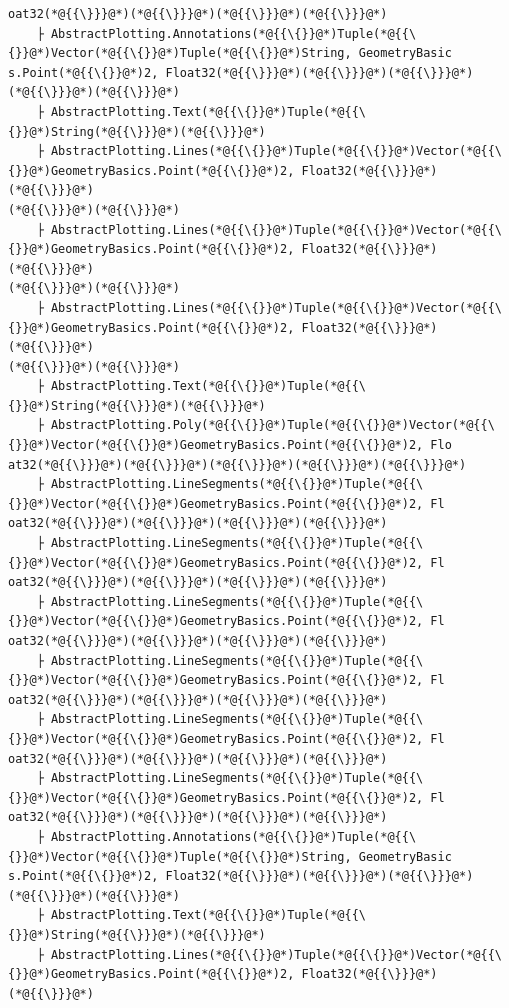 \documentclass[12pt,a4paper]{article}
\begin{document}
\begin{lstlisting}
oat32(*@{{\}}}@*)(*@{{\}}}@*)(*@{{\}}}@*)(*@{{\}}}@*)
    ├ AbstractPlotting.Annotations(*@{{\{}}@*)Tuple(*@{{\{}}@*)Vector(*@{{\{}}@*)Tuple(*@{{\{}}@*)String, GeometryBasic
s.Point(*@{{\{}}@*)2, Float32(*@{{\}}}@*)(*@{{\}}}@*)(*@{{\}}}@*)(*@{{\}}}@*)(*@{{\}}}@*)
    ├ AbstractPlotting.Text(*@{{\{}}@*)Tuple(*@{{\{}}@*)String(*@{{\}}}@*)(*@{{\}}}@*)
    ├ AbstractPlotting.Lines(*@{{\{}}@*)Tuple(*@{{\{}}@*)Vector(*@{{\{}}@*)GeometryBasics.Point(*@{{\{}}@*)2, Float32(*@{{\}}}@*)(*@{{\}}}@*)
(*@{{\}}}@*)(*@{{\}}}@*)
    ├ AbstractPlotting.Lines(*@{{\{}}@*)Tuple(*@{{\{}}@*)Vector(*@{{\{}}@*)GeometryBasics.Point(*@{{\{}}@*)2, Float32(*@{{\}}}@*)(*@{{\}}}@*)
(*@{{\}}}@*)(*@{{\}}}@*)
    ├ AbstractPlotting.Lines(*@{{\{}}@*)Tuple(*@{{\{}}@*)Vector(*@{{\{}}@*)GeometryBasics.Point(*@{{\{}}@*)2, Float32(*@{{\}}}@*)(*@{{\}}}@*)
(*@{{\}}}@*)(*@{{\}}}@*)
    ├ AbstractPlotting.Text(*@{{\{}}@*)Tuple(*@{{\{}}@*)String(*@{{\}}}@*)(*@{{\}}}@*)
    ├ AbstractPlotting.Poly(*@{{\{}}@*)Tuple(*@{{\{}}@*)Vector(*@{{\{}}@*)Vector(*@{{\{}}@*)GeometryBasics.Point(*@{{\{}}@*)2, Flo
at32(*@{{\}}}@*)(*@{{\}}}@*)(*@{{\}}}@*)(*@{{\}}}@*)(*@{{\}}}@*)
    ├ AbstractPlotting.LineSegments(*@{{\{}}@*)Tuple(*@{{\{}}@*)Vector(*@{{\{}}@*)GeometryBasics.Point(*@{{\{}}@*)2, Fl
oat32(*@{{\}}}@*)(*@{{\}}}@*)(*@{{\}}}@*)(*@{{\}}}@*)
    ├ AbstractPlotting.LineSegments(*@{{\{}}@*)Tuple(*@{{\{}}@*)Vector(*@{{\{}}@*)GeometryBasics.Point(*@{{\{}}@*)2, Fl
oat32(*@{{\}}}@*)(*@{{\}}}@*)(*@{{\}}}@*)(*@{{\}}}@*)
    ├ AbstractPlotting.LineSegments(*@{{\{}}@*)Tuple(*@{{\{}}@*)Vector(*@{{\{}}@*)GeometryBasics.Point(*@{{\{}}@*)2, Fl
oat32(*@{{\}}}@*)(*@{{\}}}@*)(*@{{\}}}@*)(*@{{\}}}@*)
    ├ AbstractPlotting.LineSegments(*@{{\{}}@*)Tuple(*@{{\{}}@*)Vector(*@{{\{}}@*)GeometryBasics.Point(*@{{\{}}@*)2, Fl
oat32(*@{{\}}}@*)(*@{{\}}}@*)(*@{{\}}}@*)(*@{{\}}}@*)
    ├ AbstractPlotting.LineSegments(*@{{\{}}@*)Tuple(*@{{\{}}@*)Vector(*@{{\{}}@*)GeometryBasics.Point(*@{{\{}}@*)2, Fl
oat32(*@{{\}}}@*)(*@{{\}}}@*)(*@{{\}}}@*)(*@{{\}}}@*)
    ├ AbstractPlotting.LineSegments(*@{{\{}}@*)Tuple(*@{{\{}}@*)Vector(*@{{\{}}@*)GeometryBasics.Point(*@{{\{}}@*)2, Fl
oat32(*@{{\}}}@*)(*@{{\}}}@*)(*@{{\}}}@*)(*@{{\}}}@*)
    ├ AbstractPlotting.Annotations(*@{{\{}}@*)Tuple(*@{{\{}}@*)Vector(*@{{\{}}@*)Tuple(*@{{\{}}@*)String, GeometryBasic
s.Point(*@{{\{}}@*)2, Float32(*@{{\}}}@*)(*@{{\}}}@*)(*@{{\}}}@*)(*@{{\}}}@*)(*@{{\}}}@*)
    ├ AbstractPlotting.Text(*@{{\{}}@*)Tuple(*@{{\{}}@*)String(*@{{\}}}@*)(*@{{\}}}@*)
    ├ AbstractPlotting.Lines(*@{{\{}}@*)Tuple(*@{{\{}}@*)Vector(*@{{\{}}@*)GeometryBasics.Point(*@{{\{}}@*)2, Float32(*@{{\}}}@*)(*@{{\}}}@*)

\end{lstlisting}
\end{document}
